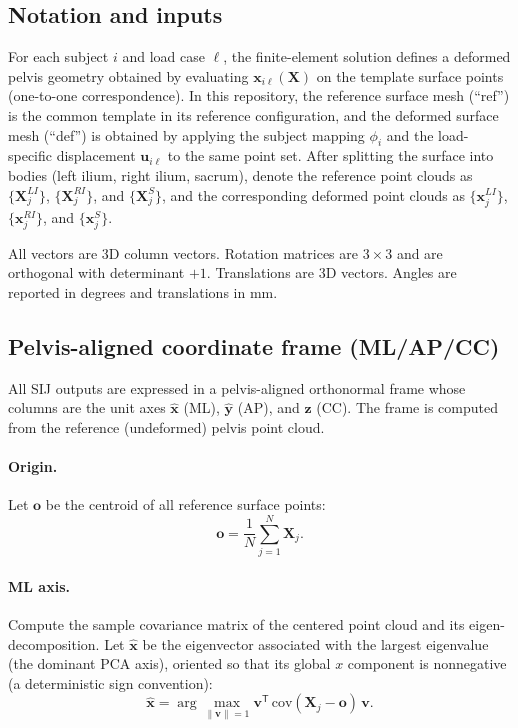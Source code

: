 \subsection{Notation and inputs}
For each subject $i$ and load case $\ell$, the finite-element solution defines a deformed pelvis geometry obtained by evaluating $\mathbf{x}_{i\ell}(\mathbf{X})$ on the template surface points (one-to-one correspondence). In this repository, the reference surface mesh (``ref'') is the common template in its reference configuration, and the deformed surface mesh (``def'') is obtained by applying the subject mapping $\phi_i$ and the load-specific displacement $\mathbf{u}_{i\ell}$ to the same point set.
After splitting the surface into bodies (left ilium, right ilium, sacrum), denote the reference point clouds as
$\{\mathbf{X}^{LI}_j\}$, $\{\mathbf{X}^{RI}_j\}$, and $\{\mathbf{X}^{S}_j\}$, and the corresponding deformed point clouds as
$\{\mathbf{x}^{LI}_j\}$, $\{\mathbf{x}^{RI}_j\}$, and $\{\mathbf{x}^{S}_j\}$.

All vectors are 3D column vectors.
Rotation matrices are $3\times 3$ and are orthogonal with determinant $+1$.
Translations are 3D vectors.
Angles are reported in degrees and translations in mm.

\subsection{Pelvis-aligned coordinate frame (ML/AP/CC)}
All SIJ outputs are expressed in a pelvis-aligned orthonormal frame whose columns are the unit axes
$\hat{\mathbf{x}}$ (ML), $\hat{\mathbf{y}}$ (AP), and $\hat{\mathbf{z}}$ (CC).
The frame is computed from the reference (undeformed) pelvis point cloud.

\paragraph{Origin.}
Let $\mathbf{o}$ be the centroid of all reference surface points:
\begin{equation}
\mathbf{o}=\frac{1}{N}\sum_{j=1}^{N}\mathbf{X}_j.
\end{equation}

\paragraph{ML axis.}
Compute the sample covariance matrix of the centered point cloud and its eigen-decomposition.
Let $\hat{\mathbf{x}}$ be the eigenvector associated with the largest eigenvalue (the dominant PCA axis), oriented so that its global $x$ component is nonnegative (a deterministic sign convention):
\begin{equation}
\hat{\mathbf{x}}=\arg\max_{\|\mathbf{v}\|=1}\mathbf{v}^\mathsf{T}\,\mathrm{cov}(\mathbf{X}_j-\mathbf{o})\,\mathbf{v}.
\end{equation}

